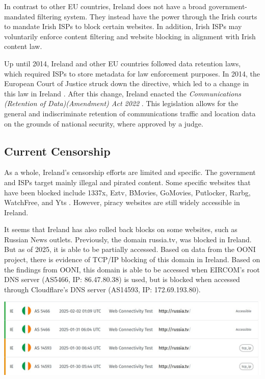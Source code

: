 In contrast to other EU countries, Ireland does not have a broad government-mandated filtering system. They instead have the power through the Irish courts to mandate Irish ISPs to block certain websites. In addition, Irish ISPs may voluntarily enforce content filtering and website blocking in alignment with Irish content law.

Up until 2014, Ireland and other EU countries followed data retention laws, which required ISPs to store metadata for law enforcement purposes. In 2014, the European Court of Justice struck down the directive, which led to a change in this law in Ireland \cite{DataRetentionInvalid2014}. After this change, Ireland enacted the \textit{Communications (Retention of Data)(Amendment) Act 2022} \cite{irishlegalDataRetention}. This legislation allows for the general and indiscriminate retention of communications traffic and location data on the grounds of national security, where approved by a judge.

\subsection{Current Censorship}

As a whole, Ireland's censorship efforts are limited and specific. The government and ISPs target mainly illegal and pirated content. Some specific websites that have been blocked include 1337x, Eztv, BMovies, GoMovies, Putlocker, Rarbg, WatchFree, and Yts \cite{siliconrepublicMovieIndustry}. However, piracy websites are still widely accessible in Ireland.

It seems that Ireland has also rolled back blocks on some websites, such as Russian News outlets. Previously, the domain russia.tv, was blocked in Ireland. But as of 2025, it is able to be partially accessed. Based on data from the OONI project, there is evidence of TCP/IP blocking of this domain in Ireland. Based on the findings from OONI, this domain is able to be accessed when EIRCOM's root DNS server (AS5466, IP: 86.47.80.38) is used, but is blocked when accessed through Cloudflare's DNS server (AS14593, IP: 172.69.193.80).

\centerline{\includegraphics[width=480pt]{Griff/TCD SCSS CAPSTONE/Literature Review/RussiaTV search OONI.jpg}}

